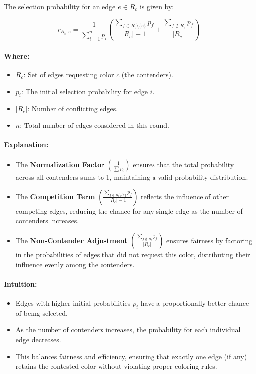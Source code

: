\documentclass[11pt]{article}
\begin{document}
The selection probability for an edge $e \in R_c$ is given by:

\[
r_{R_c, e} = \frac{1}{\sum_{i=1}^{n} p_i} \left( \frac{\sum_{f \in R_c \setminus \{e\}} p_f}{|R_c| - 1} + \frac{\sum_{f \notin R_c} p_f}{|R_c|} \right)
\]

\paragraph{Where:}
\begin{itemize}
    \item $R_c$: Set of edges requesting color $c$ (the contenders).
    \item $p_i$: The initial selection probability for edge $i$.
    \item $|R_c|$: Number of conflicting edges.
    \item $n$: Total number of edges considered in this round.
\end{itemize}

\paragraph{Explanation:}
\begin{itemize}
    \item The \textbf{Normalization Factor} $\left( \frac{1}{\sum p_i} \right)$ ensures that the total probability across all contenders sums to 1, maintaining a valid probability distribution.
    
    \item The \textbf{Competition Term} $\left( \frac{\sum_{f \in R_c \setminus \{e\}} p_f}{|R_c| - 1} \right)$ reflects the influence of other competing edges, reducing the chance for any single edge as the number of contenders increases.
    
    \item The \textbf{Non-Contender Adjustment} $\left( \frac{\sum_{f \notin R_c} p_f}{|R_c|} \right)$ ensures fairness by factoring in the probabilities of edges that did not request this color, distributing their influence evenly among the contenders.
\end{itemize}

\paragraph{Intuition:}
\begin{itemize}
    \item Edges with higher initial probabilities $p_i$ have a proportionally better chance of being selected.
    \item As the number of contenders increases, the probability for each individual edge decreases.
    \item This balances fairness and efficiency, ensuring that exactly one edge (if any) retains the contested color without violating proper coloring rules.
\end{itemize}
\end{document}
